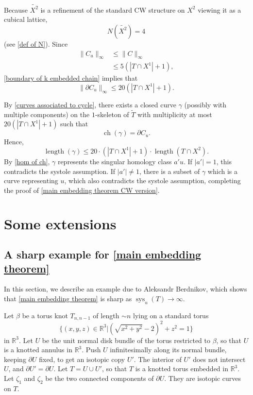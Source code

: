\documentclass[12pt]{amsart}
\DeclareMathOperator*{\ch}{ch}
\DeclareMathOperator*{\length}{length}
\DeclareMathOperator*{\sys}{sys}
\theoremstyle{definition}
\begin{document}
Because $\widetilde{X^2}$ is a refinement of the standard CW structure on $X^2$ viewing it as a cubical lattice, $$N(\widetilde{X^2})=4$$ (see \cref{def of N}). Since 
\begin{align*}\|C_{u}\|_\infty&\leq\|C\|_\infty\\ &\leq 5(|T\cap X^1|+1),
\end{align*} \cref{boundary of k embedded chain} implies that  $$\|\partial C_{u}\|_\infty\leq 20(|T\cap X^1|+1).$$ 

By \cref{curves associated to cycle}, there exists a closed curve $\gamma$ (possibly with multiple components) on the $1$-skeleton of $\widetilde{T}$ with multiplicity at most $20(|T\cap X^1|+1)$ such that $$\ch(\gamma)=\partial C_u.$$ Hence, $$\length (\gamma)\leq 20\cdot (|T\cap X^1|+1)\cdot \length(T\cap X^2).$$ By \cref{hom of ch}, $\gamma$ represents the singular homology class $a'u$. If $|a'|=1$, this contradicts the systole assumption. If $|a'|\neq 1$, there is a subset of $\gamma$ which is a curve representing $u$, which also contradicts the systole assumption, completing the proof of \cref{main embedding theorem CW version}.

\appendix

\section{Some extensions}

\subsection{A sharp example for \cref{main embedding theorem}} \label{Appendix A1} In this section, we describe an example due to Aleksandr Berdnikov, which shows that \cref{main embedding theorem} is sharp as $\sys_u(T)\to \infty$.

Let $\beta$ be a torus knot $T_{n,n-1}$ of length $\sim n$ lying on a standard torus $$\{(x,y,z)\in \mathbb{R}^3|(\sqrt{x^2+y^2}-2)^2+z^2=1\}$$ in $\mathbb{R}^3$. Let $U$ be the unit normal disk bundle of the torus restricted to $\beta$, so that $U$ is a knotted annulus in $\mathbb{R}^3$. Push $U$ infinitesimally along its normal bundle, keeping $\partial U$ fixed, to get an isotopic copy $U'$.  The interior of $U'$ does not intersect $U$, and  $\partial U'=\partial U$. Let $T=U\cup U'$, so that $T$ is a knotted torus embedded in $\mathbb{R}^3$. Let $\zeta_1$ and $\zeta_2$ be the two connected components of $\partial U$. They are isotopic curves on $T$.
\end{document}
